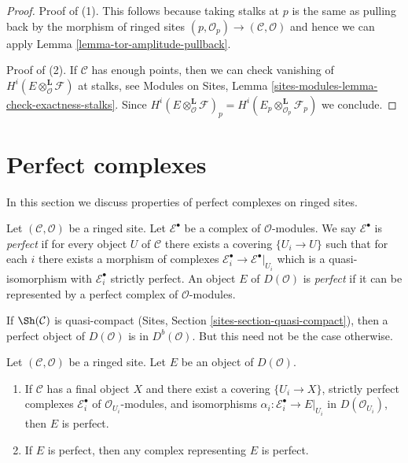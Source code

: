 \begin{proof}
Proof of (1). This follows because taking stalks at $p$ is
the same as pulling back by the morphism of ringed sites
$(p, \mathcal{O}_p) \to (\mathcal{C}, \mathcal{O})$ and hence
we can apply Lemma \ref{lemma-tor-amplitude-pullback}.

\medskip\noindent
Proof of (2). If $\mathcal{C}$ has enough points, then we can check
vanishing of
$H^i(E \otimes_\mathcal{O}^\mathbf{L} \mathcal{F})$
at stalks, see
Modules on Sites, Lemma \ref{sites-modules-lemma-check-exactness-stalks}.
Since $H^i(E \otimes_\mathcal{O}^\mathbf{L} \mathcal{F})_p =
H^i(E_p \otimes_{\mathcal{O}_p}^\mathbf{L} \mathcal{F}_p)$ we conclude.
\end{proof}










\section{Perfect complexes}
\label{section-perfect}

\noindent
In this section we discuss properties of perfect complexes on
ringed sites.

\begin{definition}
\label{definition-perfect}
Let $(\mathcal{C}, \mathcal{O})$ be a ringed site.
Let $\mathcal{E}^\bullet$ be a complex of $\mathcal{O}$-modules.
We say $\mathcal{E}^\bullet$ is {\it perfect} if for every object $U$ of
$\mathcal{C}$ there exists a covering $\{U_i \to U\}$ such that for each $i$
there exists a morphism of complexes
$\mathcal{E}_i^\bullet \to \mathcal{E}^\bullet|_{U_i}$
which is a quasi-isomorphism with $\mathcal{E}_i^\bullet$
strictly perfect.
An object $E$ of $D(\mathcal{O})$ is {\it perfect}
if it can be represented by a perfect complex of $\mathcal{O}$-modules.
\end{definition}

\noindent
If $\Sh(\mathcal{C})$ is quasi-compact
(Sites, Section \ref{sites-section-quasi-compact}),
then a perfect object of $D(\mathcal{O})$
is in $D^b(\mathcal{O})$. But this need not be the case otherwise.

\begin{lemma}
\label{lemma-perfect-independent-representative}
Let $(\mathcal{C}, \mathcal{O})$ be a ringed site.
Let $E$ be an object of $D(\mathcal{O})$.
\begin{enumerate}
\item If $\mathcal{C}$ has a final object $X$ and there exist a
covering $\{U_i \to X\}$, strictly perfect complexes $\mathcal{E}_i^\bullet$
of $\mathcal{O}_{U_i}$-modules, and isomorphisms
 $\alpha_i : \mathcal{E}_i^\bullet \to E|_{U_i}$ in
$D(\mathcal{O}_{U_i})$, then $E$ is perfect.
\item If $E$ is perfect, then any complex representing $E$ is perfect.
\end{enumerate}
\end{lemma}

